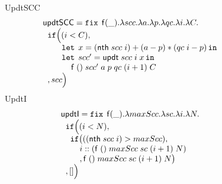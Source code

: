 \documentclass[a4paper,11pt]{article}
\theoremstyle{definition}
\begin{document}
\begin{figure}
\[\begin{array}{l}
\end{array}
\]
UpdtSCC
\[
\begin{array}{l}
 \mathsf{updtSCC} = \mathop{\mathtt{fix}} \;  \mathsf{f}(\_). \lambda scc. \lambda a. \lambda
  p. \lambda qc.  \lambda i. \lambda C. \\
 \hspace{.2cm} \mathtt{if}   \Big (   (i < C)  ,  \\
 \hspace{0.8cm} \mathop{\mathtt{let}} \; x =( \mathsf{nth} \; scc \; i) + (a-p)*(qc
  \; i - p)  \mathop{ \mathtt{in}} \\
 \hspace{0.8cm} \mathop{\mathtt{let}} \; scc' =  \mathsf{updt} \; scc \; i
  \; x \mathop{ \mathtt{in}} \\
  \hspace{1.2cm} \mathsf{f}  \; () \; scc' \; a \; p
 \; qc   \; (i+1) \;  C  \\ 
\hspace{0.2cm}   ,  scc  \Big ) \\
\end{array}
\]
UpdtI
\[
\begin{array}{l}
 \mathsf{updtI} = \mathop{\mathtt{fix}} \;  \mathsf{f}(\_). \lambda maxScc. \lambda sc. \lambda
  i. \lambda N. \\
 \hspace{.2cm} \mathtt{if}   \Big (   (i < N)  ,  \\
\hspace{0.4cm}  \mathtt{if} \big( ( ( \mathsf{nth} \; scc \; i)  >  maxScc  ) ,       \\
 \hspace{0.8cm}   i :: ( \mathsf{f}  \; () \; maxScc \; sc
  \; (i+1) \; N  )\\
 \hspace{0.8cm} , \mathsf{f}  \; () \; maxScc \; sc
  \; (i+1) \; N  \big )  \\
\hspace{0.2cm}   ,  [] \Big ) \\
\end{array}
\]
\end{figure}
\end{document}
